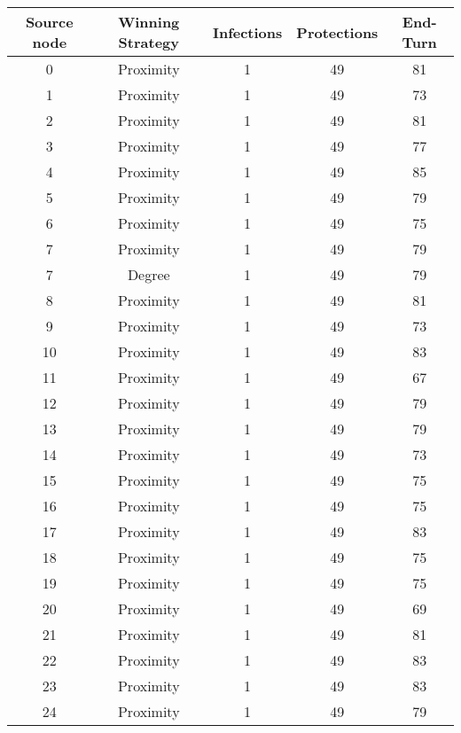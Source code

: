 \documentclass[results.tex]{subfiles}
\begin{document}
\begin{center}
  \begin{tabular}{| c || c | c | c | c |}
    \hline
    {\bfseries Source node} & {\bfseries Winning Strategy} & {\bfseries Infections} & {\bfseries Protections} & {\bfseries End-Turn} \\  %
    \hline\hline
    0 & Proximity & 1 & 49 & 81 \\ 
    \hline
    1 & Proximity & 1 & 49 & 73 \\ 
    \hline
    2 & Proximity & 1 & 49 & 81 \\ 
    \hline
    3 & Proximity & 1 & 49 & 77 \\ 
    \hline
    4 & Proximity & 1 & 49 & 85 \\ 
    \hline
    5 & Proximity & 1 & 49 & 79 \\ 
    \hline
    6 & Proximity & 1 & 49 & 75 \\ 
    \hline
    7 & Proximity & 1 & 49 & 79 \\ 
    \hline
    7 & Degree & 1 & 49 & 79 \\ 
    \hline
    8 & Proximity & 1 & 49 & 81 \\ 
    \hline
    9 & Proximity & 1 & 49 & 73 \\ 
    \hline
    10 & Proximity & 1 & 49 & 83 \\ 
    \hline
    11 & Proximity & 1 & 49 & 67 \\ 
    \hline
    12 & Proximity & 1 & 49 & 79 \\ 
    \hline
    13 & Proximity & 1 & 49 & 79 \\ 
    \hline
    14 & Proximity & 1 & 49 & 73 \\ 
    \hline
    15 & Proximity & 1 & 49 & 75 \\ 
    \hline
    16 & Proximity & 1 & 49 & 75 \\ 
    \hline
    17 & Proximity & 1 & 49 & 83 \\ 
    \hline
    18 & Proximity & 1 & 49 & 75 \\ 
    \hline
    19 & Proximity & 1 & 49 & 75 \\ 
    \hline
    20 & Proximity & 1 & 49 & 69 \\ 
    \hline
    21 & Proximity & 1 & 49 & 81 \\ 
    \hline
    22 & Proximity & 1 & 49 & 83 \\ 
    \hline
    23 & Proximity & 1 & 49 & 83 \\ 
    \hline
    24 & Proximity & 1 & 49 & 79 \\ 

\end{tabular}
\end{center}
\end{document}

